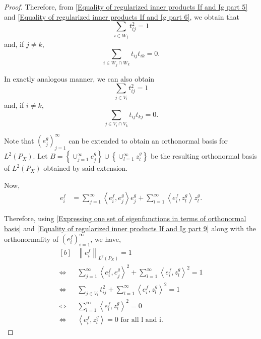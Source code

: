 \documentclass{article}
\theoremstyle{plain}
\newcommand{\norm}[1]{\left\|#1\right\|}
\newcommand{\inprod}[1]{\left \langle #1 \right\rangle}
\newcommand{\LPtwo}{L^{2}(P_{X})}
\begin{document}
\begin{proof}
    Therefore, from \eqref{Equality of regularized inner products If and Ig part 5} and \eqref{Equality of regularized inner products If and Ig part 6}, we obtain that
    \begin{equation}\label{Equality of regularized inner products If and Ig part 7}
        \sum_{i \in W_{j}}t_{ij}^{2} = 1
    \end{equation}
    and, if $j \neq k$,
    \begin{equation}\label{Equality of regularized inner products If and Ig part 8}
        \sum_{i \in W_{j}\cap W_{k}}t_{ij}t_{ik}=0.
    \end{equation}

    In exactly analogous manner, we can also obtain 
    \begin{equation}\label{Equality of regularized inner products If and Ig part 9}
        \sum_{j \in V_{i}}t_{ij}^{2} = 1
    \end{equation}
    and, if $i \neq k$,
    \begin{equation}\label{Equality of regularized inner products If and Ig part 10}
        \sum_{j \in V_{i}\cap V_{k}}t_{ij}t_{kj}=0.
    \end{equation}

    Note that $(e_{j}^{g})_{j=1}^{\infty}$ can be extended to obtain an orthonormal basis for $\LPtwo$. Let $B=\left\{\cup_{j=1}^{\infty}e_{j}^{g}\right\} \cup \left\{\cup_{l=1}^{\infty}z_{l}^{g}\right\}$ be the resulting orthonormal basis of $\LPtwo$ obtained by said extension.

    Now,
    \begin{equation}\label{Expressing one set of eigenfunctions in terms of orthonormal basis}
        \begin{aligned}
            e_{i}^{f} &= \sum_{j=1}^{\infty} \inprod{e_{i}^{f},e_{j}^{g}}e_{j}^{g} + \sum_{l=1}^{\infty} \inprod{e_{i}^{f},z_{l}^{g}}z_{l}^{g}.
        \end{aligned}
    \end{equation}

    Therefore, using \eqref{Expressing one set of eigenfunctions in terms of orthonormal basis} and \eqref{Equality of regularized inner products If and Ig part 9} along with the orthonormality of $(e_{i}^{f})_{i=1}^{\infty}$, we have,
     \begin{equation*}\label{Expressing one set of eigenfunctions in terms of other set of eigenfunctions}
        \begin{aligned}[b]
            &\norm{e_{i}^{f}}_{\LPtwo} = 1\\
            \iff &\sum_{j=1}^{\infty} \inprod{e_{i}^{f},e_{j}^{g}}^{2} + \sum_{l=1}^{\infty} \inprod{e_{i}^{f},z_{l}^{g}}^{2} = 1\\
            \iff & \sum_{j \in V_{i}} t_{ij}^{2} + \sum_{l=1}^{\infty} \inprod{e_{i}^{f},z_{l}^{g}}^{2} = 1\\
            \iff &  \sum_{l=1}^{\infty} \inprod{e_{i}^{f},z_{l}^{g}}^{2} = 0\\
            \iff & \inprod{e_{i}^{f},z_{l}^{g}} = 0 \textrm{ for all l and i}.
        \end{aligned}
    \end{equation*}


\end{proof}
\end{document}
